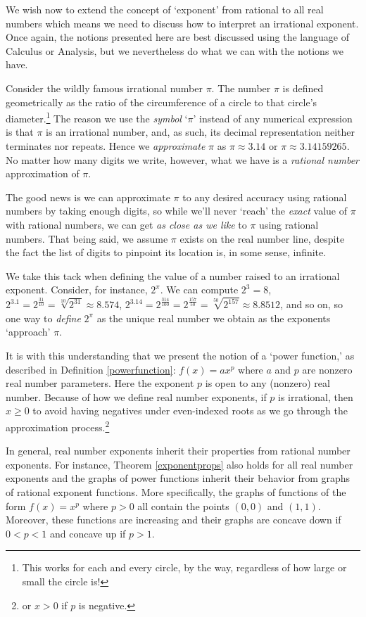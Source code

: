 \documentclass{ximera}
\begin{document}
We wish now to extend the concept of `exponent' from rational to all real numbers which means we need to discuss how to interpret an irrational exponent.  Once again, the notions presented here are best discussed using the language of Calculus or Analysis, but we nevertheless do what we can with the notions we have.  

Consider  the wildly famous irrational number $\pi$.  The number $\pi$ is defined geometrically as the ratio of the circumference of a circle to that circle's diameter.\footnote{This works for each and every circle, by the way, regardless of how large or small the circle is!} The reason we use the \textit{symbol} `$\pi$' instead of any numerical expression is that $\pi$ is an irrational number, and, as such, its decimal representation neither terminates nor repeats.  Hence we \textit{approximate} $\pi$ as $\pi \approx 3.14$ or $\pi \approx 3.14159265$.  No matter how many digits we write, however, what we have is a \textit{rational number} approximation of $\pi$. 


The good news is we can approximate $\pi$ to any desired accuracy using rational numbers by taking enough digits, so while we'll never `reach' the \textit{exact} value of $\pi$ with rational numbers, we can get \textit{as close as we like} to $\pi$ using rational numbers.  That being said, we assume $\pi$ exists on the real number line, despite the fact the list of digits to pinpoint its location is, in some sense, infinite.

We take this tack  when defining the value of a number raised to an irrational exponent.  Consider, for instance, $2^{\pi}$.  We can compute $2^3 = 8$, $2^{3.1} = 2^{\frac{31}{10}} = \sqrt[10]{2^{31}} \approx 8.574 $, $2^{3.14} = 2^{\frac{314}{100}} = 2^{\frac{157}{50}} = \sqrt[50]{2^{157}} \approx 8.8512$, and so on, so one way to  \textit{define} $2^{\pi}$ as the unique real number we obtain  as the exponents `approach' $\pi$. 

It is with this understanding that we present the notion of a `power function,' as described in Definition   \ref{powerfunction}:  $f(x) = a x^p$ where $a$ and $p$ are nonzero real number parameters.  Here the exponent $p$ is open to any (nonzero) real number.  Because of how we define real number exponents, if $p$ is irrational, then $ x \geq 0$ to avoid having negatives under even-indexed roots as we go through the approximation process.\footnote{or $x > 0$ if $p$ is negative.} 

In general, real number exponents inherit their properties from rational number exponents.  For instance, Theorem \ref{exponentprops} also holds for all real number exponents and the graphs of power functions inherit their behavior from graphs of rational exponent functions.  More specifically, the graphs of functions of the form $f(x)= x^p$ where $p>0$ all contain the points $(0,0)$ and $(1,1)$.  Moreover, these functions are increasing and their graphs are  concave down if $0<p<1$ and concave up if $p>1$. 
\end{document}
